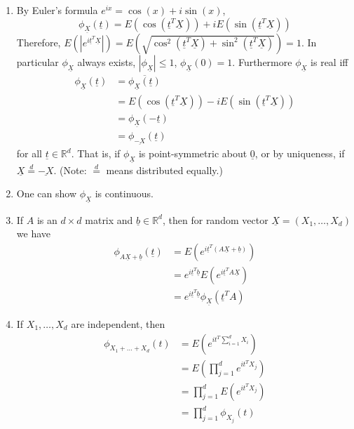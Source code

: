 \documentclass{article}
\newcommand{\R}{\mathbb{R}}
\begin{document}
			\begin{myrem}{}{}
				\begin{enumerate}
					\item By Euler's formula $e^{ix}=\cos(x)+i\sin(x)$, $$\phi_{\underline{X}}(\underline{t})=E(\cos(\underline{t}^T\underline{X}))+iE(\sin(\underline{t}^T\underline{X}))$$
					Therefore, $E(|e^{i\underline{t}^T\underline{X}}|)=E(\sqrt{\cos^2(\underline{t}^T\underline{X})+\sin^2(\underline{t}^T\underline{X})})=1$. In particular $\phi_{\underline{X}}$ always exists, $|\phi_{\underline{X}}|\leq1$, $\phi_{\underline{X}}(0)=1$. Furthermore $\phi_{\underline{X}}$ is real iff
					\begin{align*}
						\phi_{\underline{X}}(\underline{t})&=\overline{\phi_{\underline{X}}(\underline{t})}\\
						&=E(\cos(\underline{t}^T\underline{X}))-iE(\sin(\underline{t}^T\underline{X}))\\
						&=\phi_{\underline{X}}(-\underline{t})\\
						&=\phi_{\underline{-X}}(\underline{t})
					\end{align*}
					for all $\underline{t}\in\R^d$. That is, if $\phi_{\underline{X}}$ is point-symmetric about $\underline{0}$, or by uniqueness, if $\underline{X}\stackrel{d}{=}\underline{-X}$. (Note: $\stackrel{d}{=}$ means distributed equally.)
					
					\item One can show $\phi_{\underline{X}}$ is continuous.
					
					\item If $A$ is an $d\times d$ matrix and $\underline{b}\in\R^d$, then for random vector $\underline{X}=(X_1, \dots, X_d)$ we have
					\begin{align*}
						\phi_{A\underline{X}+\underline{b}}(\underline{t})&=E(e^{i\underline{t}^T(A\underline{X}+\underline{b})})\\
						&=e^{i\underline{t}^T\underline{b}}E(e^{i\underline{t}^TA\underline{X}})\\
						&=e^{i\underline{t}^T\underline{b}}\phi_{\underline{X}}(\underline{t}^TA)
					\end{align*}
					
					\item If $X_1, \dots, X_d$ are independent, then
					\begin{align*}
						\phi_{X_1+\dots+X_d}(t)&=E(e^{it^T\sum_{i=1}^dX_i})\\
						&=E(\prod_{j=1}^de^{it^TX_j})\\
						&=\prod_{j=1}^dE(e^{it^TX_j})\\
						&=\prod_{j=1}^d\phi_{X_j}(t)
					\end{align*}
				\end{enumerate}
			\end{myrem}
			
\end{document}
